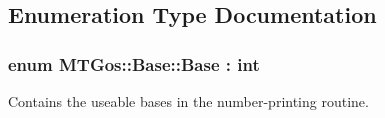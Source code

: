 \subsection{Enumeration Type Documentation}
\hypertarget{namespace_m_t_gos_1_1_base_a985066b1d1e61799ead33462c57496a1}{}
\subsubsection[{Base}]{\setlength{\rightskip}{0pt plus 5cm}enum {\bf M\+T\+Gos\+::\+Base\+::\+Base} \+: int\hspace{0.3cm}{\ttfamily [strong]}}\label{namespace_m_t_gos_1_1_base_a985066b1d1e61799ead33462c57496a1}


Contains the useable bases in the number-\/printing routine. 

